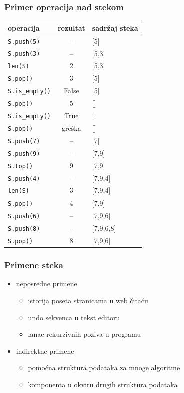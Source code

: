 \documentclass[compress]{beamer}
\begin{document}
\begin{frame}[fragile,shrink=10]
  \frametitle{Primer operacija nad stekom}
\begin{center}
\begin{tabular}{lcl}
\textbf{operacija} & \textbf{rezultat} & \textbf{sadržaj steka} \\
\hline \hline
\texttt{S.push(5)} & -- & [5] \\ 
\texttt{S.push(3)} & -- & [5,3] \\ 
\texttt{len(S)} & 2 & [5,3] \\ 
\texttt{S.pop()} & 3 & [5] \\ 
\texttt{S.is\_empty()} & False & [5] \\ 
\texttt{S.pop()} & 5 & [] \\ 
\texttt{S.is\_empty()} & True & [] \\ 
\texttt{S.pop()} & greška & [] \\ 
\texttt{S.push(7)} & -- & [7] \\ 
\texttt{S.push(9)} & -- & [7,9] \\ 
\texttt{S.top()} & 9 & [7,9] \\ 
\texttt{S.push(4)} & -- & [7,9,4] \\ 
\texttt{len(S)} & 3 & [7,9,4] \\ 
\texttt{S.pop()} & 4 & [7,9] \\ 
\texttt{S.push(6)} & -- & [7,9,6] \\ 
\texttt{S.push(8)} & -- & [7,9,6,8] \\ 
\texttt{S.pop()} & 8 & [7,9,6] \\ 
\end{tabular}
\end{center}
\end{frame}

\begin{frame}[fragile]
  \frametitle{Primene steka}
  \begin{itemize}
    \item neposredne primene
    \begin{itemize}
      \item istorija poseta stranicama u web čitaču
      \item undo sekvenca u tekst editoru
      \item lanac rekurzivnih poziva u programu
    \end{itemize}
    \item indirektne primene
    \begin{itemize}
      \item pomoćna struktura podataka za mnoge algoritme
      \item komponenta u okviru drugih struktura podataka
    \end{itemize}
  \end{itemize}
\end{frame}
\end{document}
